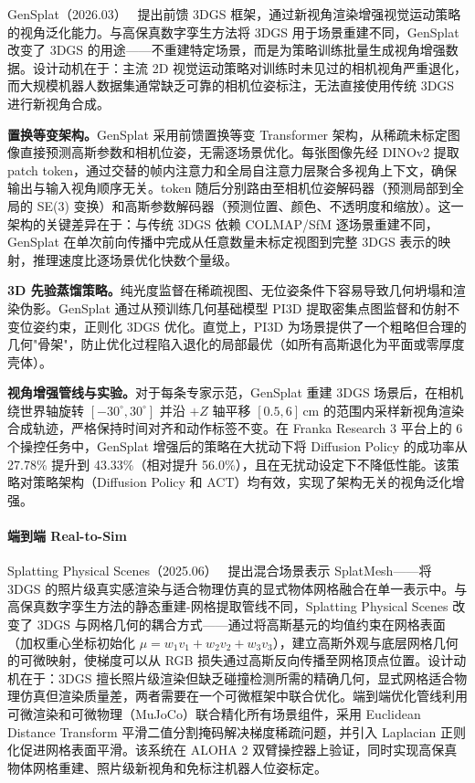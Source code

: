 GenSplat（2026.03）~\cite{2603_29192} 提出前馈 3DGS 框架，通过新视角渲染增强视觉运动策略的视角泛化能力。与高保真数字孪生方法将 3DGS 用于场景重建不同，GenSplat 改变了 3DGS 的用途——不重建特定场景，而是为策略训练批量生成视角增强数据。设计动机在于：主流 2D 视觉运动策略对训练时未见过的相机视角严重退化，而大规模机器人数据集通常缺乏可靠的相机位姿标注，无法直接使用传统 3DGS 进行新视角合成。

\textbf{置换等变架构。}GenSplat 采用前馈置换等变 Transformer 架构，从稀疏未标定图像直接预测高斯参数和相机位姿，无需逐场景优化。每张图像先经 DINOv2 提取 patch token，通过交替的帧内注意力和全局自注意力层聚合多视角上下文，确保输出与输入视角顺序无关。token 随后分别路由至相机位姿解码器（预测局部到全局的 SE(3) 变换）和高斯参数解码器（预测位置、颜色、不透明度和缩放）。这一架构的关键差异在于：与传统 3DGS 依赖 COLMAP/SfM 逐场景重建不同，GenSplat 在单次前向传播中完成从任意数量未标定视图到完整 3DGS 表示的映射，推理速度比逐场景优化快数个量级。

\textbf{3D 先验蒸馏策略。}纯光度监督在稀疏视图、无位姿条件下容易导致几何坍塌和渲染伪影。GenSplat 通过从预训练几何基础模型 PI3D 提取密集点图监督和仿射不变位姿约束，正则化 3DGS 优化。直觉上，PI3D 为场景提供了一个粗略但合理的几何"骨架"，防止优化过程陷入退化的局部最优（如所有高斯退化为平面或零厚度壳体）。

\textbf{视角增强管线与实验。}对于每条专家示范，GenSplat 重建 3DGS 场景后，在相机绕世界轴旋转 $[-30^\circ, 30^\circ]$ 并沿 $+Z$ 轴平移 $[0.5, 6]$\,cm 的范围内采样新视角渲染合成轨迹，严格保持时间对齐和动作标签不变。在 Franka Research 3 平台上的 6 个操控任务中，GenSplat 增强后的策略在大扰动下将 Diffusion Policy 的成功率从 27.78\% 提升到 43.33\%（相对提升 56.0\%），且在无扰动设定下不降低性能。该策略对策略架构（Diffusion Policy 和 ACT）均有效，实现了架构无关的视角泛化增强。

\paragraph{端到端 Real-to-Sim}

Splatting Physical Scenes（2025.06）~\cite{2506_04120} 提出混合场景表示 SplatMesh——将 3DGS 的照片级真实感渲染与适合物理仿真的显式物体网格融合在单一表示中。与高保真数字孪生方法的静态重建-网格提取管线不同，Splatting Physical Scenes 改变了 3DGS 与网格几何的耦合方式——通过将高斯基元的均值约束在网格表面（加权重心坐标初始化 $\mu = w_1 v_1 + w_2 v_2 + w_3 v_3$），建立高斯外观与底层网格几何的可微映射，使梯度可以从 RGB 损失通过高斯反向传播至网格顶点位置。设计动机在于：3DGS 擅长照片级渲染但缺乏碰撞检测所需的精确几何，显式网格适合物理仿真但渲染质量差，两者需要在一个可微框架中联合优化。端到端优化管线利用可微渲染和可微物理（MuJoCo）联合精化所有场景组件，采用 Euclidean Distance Transform 平滑二值分割掩码解决梯度稀疏问题，并引入 Laplacian 正则化促进网格表面平滑。该系统在 ALOHA 2 双臂操控器上验证，同时实现高保真物体网格重建、照片级新视角和免标注机器人位姿标定。

